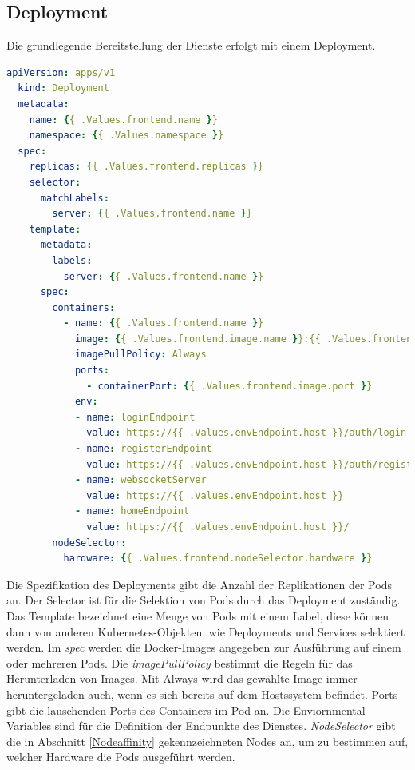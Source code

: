 \subsection{Deployment}

Die grundlegende Bereitstellung der Dienste erfolgt mit einem Deployment.

\begin{lstlisting}[caption={deployment.yaml },captionpos=b,label={lst:deploymentauth},language=yaml]
  apiVersion: apps/v1
  kind: Deployment
  metadata:
    name: {{ .Values.frontend.name }}
    namespace: {{ .Values.namespace }}
  spec:
    replicas: {{ .Values.frontend.replicas }}
    selector:
      matchLabels:
        server: {{ .Values.frontend.name }}
    template:
      metadata:
        labels:
          server: {{ .Values.frontend.name }}
      spec:
        containers:
          - name: {{ .Values.frontend.name }}
            image: {{ .Values.frontend.image.name }}:{{ .Values.frontend.image.tag }}
            imagePullPolicy: Always
            ports:
              - containerPort: {{ .Values.frontend.image.port }}
            env:
            - name: loginEndpoint
              value: https://{{ .Values.envEndpoint.host }}/auth/login
            - name: registerEndpoint
              value: https://{{ .Values.envEndpoint.host }}/auth/register
            - name: websocketServer
              value: https://{{ .Values.envEndpoint.host }}
            - name: homeEndpoint
              value: https://{{ .Values.envEndpoint.host }}/
        nodeSelector:
          hardware: {{ .Values.frontend.nodeSelector.hardware }}

\end{lstlisting}

Die Spezifikation des Deployments gibt die Anzahl der Replikationen der Pods an.
Der Selector ist für die Selektion von Pods durch das Deployment zuständig.
Das Template bezeichnet eine Menge von Pods mit einem Label, diese können dann von anderen Kubernetes-Objekten, wie Deployments und Services selektiert werden.
Im \textit{spec} werden die Docker-Images angegeben zur Ausführung auf einem oder mehreren Pods.
Die \textit{imagePullPolicy} bestimmt die Regeln für das Herunterladen von Images.
Mit Always wird das gewählte Image immer heruntergeladen auch, wenn es sich bereits auf dem Hostssystem befindet.
Ports gibt die lauschenden Ports des Containers im Pod an.
Die Enviornmental-Variables sind für die Definition der Endpunkte des Dienstes.
\textit{NodeSelector} gibt die in Abschnitt \ref{Nodeaffinity} gekennzeichneten Nodes an, um zu bestimmen auf, welcher Hardware die Pods ausgeführt werden.


